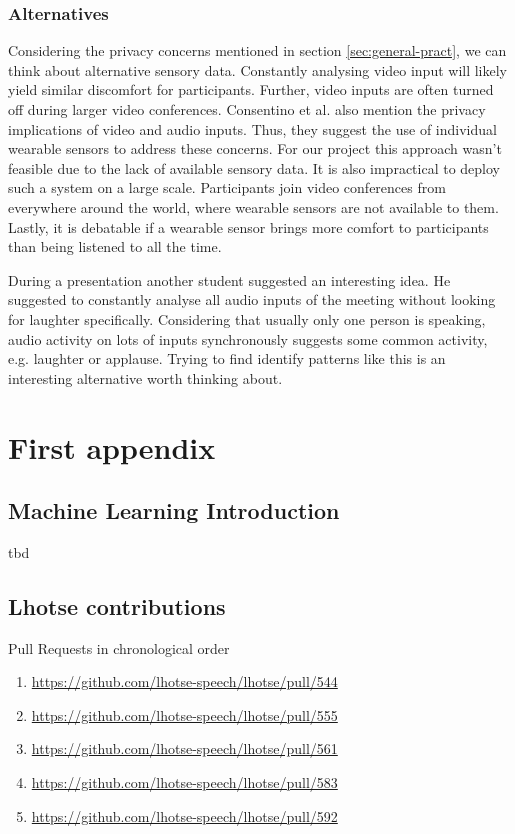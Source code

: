 \documentclass[bsc,frontabs,parskip,deptreport]{infthesis}
\begin{document}
\subsection{Alternatives}
Considering the privacy concerns mentioned in section \ref{sec:general-pract}, we can think about alternative sensory data. 
Constantly analysing video input will likely yield similar discomfort for participants. Further, video inputs are often turned off during larger video conferences.
Consentino et al. \citep{cosentino2016quantitative}  also mention the privacy implications of video and audio inputs.
Thus, they suggest the use of individual wearable sensors to address these concerns. For our project this approach wasn't feasible due to the lack of available sensory data.
It is also impractical to deploy such a system on a large scale. Participants join video conferences from everywhere around the world, where wearable sensors are not available to them. Lastly, it is debatable if a wearable sensor brings more comfort to participants than being listened to all the time. 

During a presentation another student suggested an interesting idea. He suggested to constantly analyse all audio inputs of the meeting without looking for laughter specifically. Considering that usually only one person is speaking, audio activity on lots of inputs synchronously suggests some common activity, e.g. laughter or applause. Trying to find identify patterns like this is an interesting alternative worth thinking about. 






\appendix
\chapter{First appendix}
\section{Machine Learning Introduction}\label{sec:ml-intro}
tbd 

\section{Lhotse contributions}
Pull Requests in chronological order 
\begin{enumerate}
    \item \url{https://github.com/lhotse-speech/lhotse/pull/544}
    \item \url{https://github.com/lhotse-speech/lhotse/pull/555}
    \item \url{https://github.com/lhotse-speech/lhotse/pull/561}
    \item \url{https://github.com/lhotse-speech/lhotse/pull/583}
    \item \url{https://github.com/lhotse-speech/lhotse/pull/592}
\end{enumerate}
%
\end{document}
